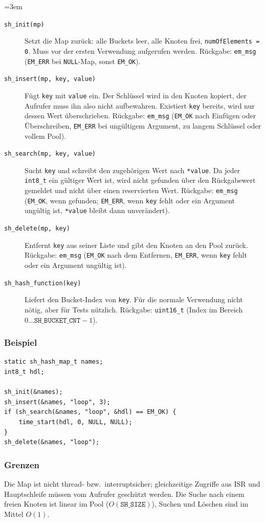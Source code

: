 {\sloppy\emergencystretch=3em
\begin{description}
\item[\texttt{sh\_init(mp)}] Setzt die Map zurück: alle Buckets leer, alle
  Knoten frei, \verb|numOfElements = 0|. Muss vor der ersten Verwendung
  aufgerufen werden. Rückgabe: \verb|em_msg| (\verb|EM_ERR| bei
  \verb|NULL|-Map, sonst \verb|EM_OK|).
\item[\texttt{sh\_insert(mp, key, value)}] Fügt \verb|key| mit \verb|value|
  ein. Der Schlüssel wird in den Knoten kopiert, der Aufrufer muss ihn also
  nicht aufbewahren. Existiert \verb|key| bereits, wird nur dessen Wert
  überschrieben. Rückgabe: \verb|em_msg| (\verb|EM_OK| nach Einfügen oder
  Überschreiben, \verb|EM_ERR| bei ungültigem Argument, zu langem Schlüssel
  oder vollem Pool).
\item[\texttt{sh\_search(mp, key, value)}] Sucht \verb|key| und schreibt den
  zugehörigen Wert nach \verb|*value|. Da jeder \verb|int8_t| ein gültiger
  Wert ist, wird \glqq nicht gefunden\grqq{} über den Rückgabewert gemeldet
  und nicht über einen reservierten Wert. Rückgabe: \verb|em_msg|
  (\verb|EM_OK|, wenn gefunden; \verb|EM_ERR|, wenn \verb|key| fehlt oder ein
  Argument ungültig ist, \verb|*value| bleibt dann unverändert).
\item[\texttt{sh\_delete(mp, key)}] Entfernt \verb|key| aus seiner Liste und
  gibt den Knoten an den Pool zurück. Rückgabe: \verb|em_msg| (\verb|EM_OK|
  nach dem Entfernen, \verb|EM_ERR|, wenn \verb|key| fehlt oder ein Argument
  ungültig ist).
\item[\texttt{sh\_hash\_function(key)}] Liefert den Bucket-Index von
  \verb|key|. Für die normale Verwendung nicht nötig, aber für Tests nützlich.
  Rückgabe: \verb|uint16_t| (Index im Bereich
  $0 \ldots \mathtt{SH\_BUCKET\_CNT} - 1$).
\end{description}
\par}

\subsubsection*{Beispiel}
\begin{listing}[H]
\begin{verbatim}
static sh_hash_map_t names;
int8_t hdl;

sh_init(&names);
sh_insert(&names, "loop", 3);
if (sh_search(&names, "loop", &hdl) == EM_OK) {
    time_start(hdl, 0, NULL, NULL);
}
sh_delete(&names, "loop");
\end{verbatim}
\caption{Verwendung von \texttt{string\_hash}}
\label{sh_example}
\end{listing}

\subsubsection*{Grenzen}
Die Map ist nicht thread- bzw.\ interruptsicher; gleichzeitige Zugriffe
aus ISR und Hauptschleife müssen vom Aufrufer geschützt werden. Die Suche
nach einem freien Knoten ist linear im Pool ($O(\mathtt{SH\_SIZE})$), Suchen
und Löschen sind im Mittel $O(1)$.
